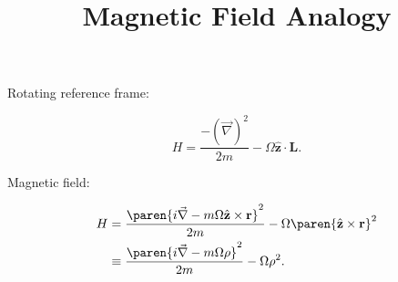 \documentclass[onecolumn,amsmath,amssymb,nofootinbib,floatfix]{revtex4}
\title{Magnetic Field Analogy}
\begin{document}
Rotating reference frame:

$$H = \frac{-(\vec\nabla)^2}{2m} - \Omega \hat{\textbf{z}}\cdot \textbf{L}.$$

Magnetic field:

$$
\begin{aligned}
H
&= \frac{\paren{i\vec\nabla - m\Omega\hat{\textbf{z}}\times\textbf{r}}^2}{2m} - \Omega \paren{\hat{\textbf{z}}\times\textbf{r}}^2\\
&\equiv \frac{\paren{i\vec\nabla - m\Omega\rho}^2}{2m} - \Omega \rho^2.
\end{aligned}
$$
\end{document}
